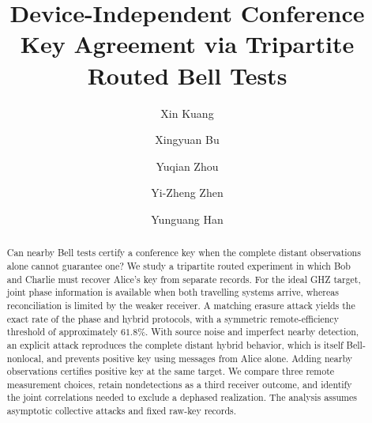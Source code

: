 \documentclass[aps,10pt,onecolumn,prx,superscriptaddress,longbibliography,nofootinbib]{revtex4-2}
\begin{document}
\title{Device-Independent Conference Key Agreement via Tripartite Routed Bell Tests}
\author{Xin Kuang}
\author{Xingyuan Bu}
\author{Yuqian Zhou}
\author{Yi-Zheng Zhen}
\author{Yunguang Han}

\begin{abstract}
Can nearby Bell tests certify a conference key when the complete distant observations alone cannot guarantee one? We study a tripartite routed experiment in which Bob and Charlie must recover Alice's key from separate records. For the ideal GHZ target, joint phase information is available when both travelling systems arrive, whereas reconciliation is limited by the weaker receiver. A matching erasure attack yields the exact rate of the phase and hybrid protocols, with a symmetric remote-efficiency threshold of approximately $61.8\%$. With source noise and imperfect nearby detection, an explicit attack reproduces the complete distant hybrid behavior, which is itself Bell-nonlocal, and prevents positive key using messages from Alice alone. Adding nearby observations certifies positive key at the same target. We compare three remote measurement choices, retain nondetections as a third receiver outcome, and identify the joint correlations needed to exclude a dephased realization. The analysis assumes asymptotic collective attacks and fixed raw-key records.
\end{abstract}

\maketitle
\end{document}

